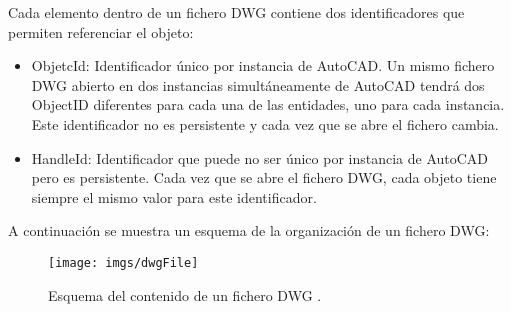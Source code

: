 Cada elemento dentro de un fichero DWG contiene dos identificadores que permiten referenciar el objeto:

\begin{itemize}

\item{ObjetcId: Identificador único por instancia de AutoCAD. Un mismo fichero DWG abierto en dos instancias simultáneamente de AutoCAD tendrá dos ObjectID diferentes para cada una de las entidades, uno para cada instancia. Este identificador no es persistente y cada vez que se abre el fichero cambia.}

\item{HandleId: Identificador que puede no ser único por instancia de AutoCAD pero es persistente. Cada vez que se abre el fichero DWG, cada objeto tiene siempre el mismo valor para este identificador.}

\end{itemize}

A continuación se muestra un esquema de la organización de un fichero DWG:

\begin{figure}[H]
\begin{center}
\texttt{[image: imgs/dwgFile]}
\caption{Esquema del contenido de un fichero DWG \cite{AutoCAD-NET-API}.}
\end{center}
\end{figure}




